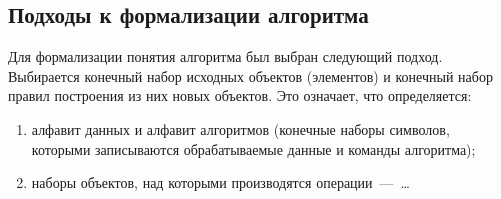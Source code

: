 \subsection{Подходы к формализации алгоритма}
Для формализации понятия алгоритма был выбран следующий подход. Выбирается конечный набор исходных объектов (элементов) и конечный набор правил построения из них новых объектов. Это означает, что определяется:
\begin{enumerate}[label=\arabic*)]
    \item алфавит данных и алфавит алгоритмов (конечные наборы символов, которыми записываются обрабатываемые данные и команды алгоритма);
    \item наборы объектов, над которыми производятся операции~---~\dots
\end{enumerate}
